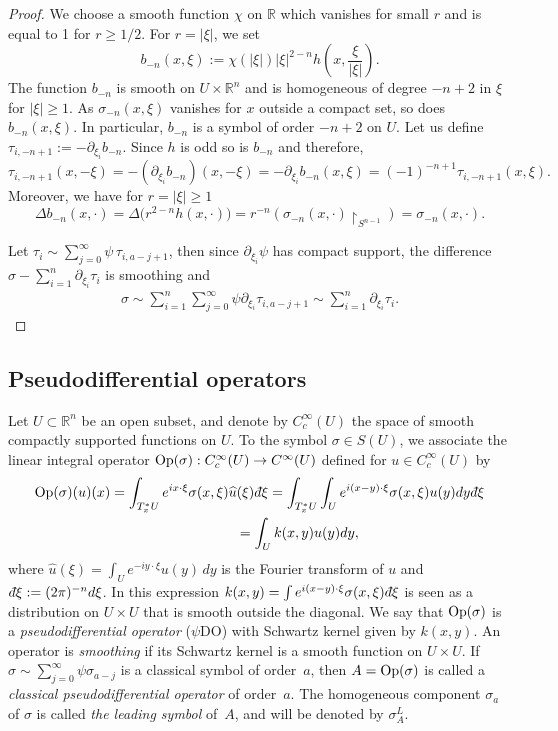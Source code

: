 \documentclass[11pt]{article}
\def\dbar{d{\hskip-1pt\bar{}}\hskip1pt}
\begin{document}
\begin{proof}
 We choose a smooth function $\chi$ on $\mathbb{R}$ which vanishes for small $r$ and is equal to 1 for $r\geq1/2$. For $r=|\xi|$, we set
\[
b_{-n}(x,\xi):=\chi(|\xi|)|\xi|^{2-n}h\left(x,\frac{\xi}{|\xi|}\right).
\]
The function $b_{-n}$ is smooth on $U\times\mathbb{R}^n$ and is homogeneous of degree $-n+2$ in $\xi$ for $|\xi|\geq1$. As $\sigma_{-n}(x,\xi)$ vanishes for $x$ outside a compact set, so does $b_{-n}(x,\xi)$. In particular, $b_{-n}$ is a symbol of order $-n+2$ on $U$. Let us def\/ine $\tau_{i,-n+1}:=-\partial_{\xi_i}b_{-n}$. Since $h$ is odd so is $b_{-n}$ and therefore,
\[
\tau_{i,-n+1}(x,-\xi)=-(\partial_{\xi_i}b_{-n})(x,-\xi)
=-\partial_{\xi_i}b_{-n}(x,\xi)
=(-1)^{-n+1}\tau_{i,-n+1}(x,\xi).
\]
Moreover, we have for $r=|\xi|\geq1$
\[
\Delta b_{-n}(x,\cdot)=\Delta\big(r^{2-n}h(x,\cdot)\big)=r^{-n}\left(\sigma_{-n}(x,\cdot)\upharpoonright_{S^{n-1}}\right)=\sigma_{-n}(x,\cdot).
\]


Let $\tau_i\sim\sum\limits_{j=0}^\infty\psi\,\tau_{i,a-j+1}$, then since $\partial_{\xi_i}\psi$ has compact support, the dif\/ference $\sigma-\sum\limits_{i=1}^n\partial_{\xi_i}\tau_i$ is smoothing and
\begin{gather*}
\sigma\sim\sum_{i=1}^n\sum_{j=0}^\infty\psi \partial_{\xi_i}\tau_{i,a-j+1}\sim\sum_{i=1}^n\partial_{\xi_i}\tau_i. \tag*{\qed}
\end{gather*}
\renewcommand{\qed}{}
\end{proof}

\subsection{Pseudodif\/ferential operators}

Let $U\subset \mathbb{R}^n$ be an open subset, and denote by $C^{\infty}_c (U)$ the space of smooth compactly supported functions on $U$. To the symbol $\sigma\in S(U)$, we associate the linear integral operator $\operatorname{Op}(\sigma):C^{\infty}_c (U)\to C^{\infty}(U)$ def\/ined for $u\in C^{\infty}_c (U)$ by
\begin{gather*}
\Op(\sigma)(u)(x) =\int_{T_x^*U}{e^{ix\cdot\xi}\sigma(x, \xi)\widehat u(\xi)\dbar\xi}
 =\int_{T_x^*U}{\int_{U}{e^{i(x-y)\cdot\xi}\sigma(x,\xi) u(y) dy\dbar\xi}}\\
\hphantom{\Op(\sigma)(u)(x)}{} =\int_{U}k(x,y)u(y)dy,
\end{gather*}
where $\widehat u(\xi)=\int_{U}{e^{-iy\cdot\xi}u(y)\,dy}$ is the Fourier transform of $u$ and $\dbar\xi:=(2\pi)^{-n}d\xi$.
In this expression $k(x,y)=\int{e^{i(x-y)\cdot\xi}\sigma(x, \xi)\dbar\xi}$ is seen as a distribution on $U\times U$ that is smooth outside the diagonal. We say that $\operatorname{Op}(\sigma)$ is a {\it pseudodifferential operator} ($\psi$DO) with Schwartz kernel given by $k(x,y)$. An operator is \emph{smoothing} if its Schwartz kernel is a smooth function on $U\times U$. If $\sigma\sim \sum\limits_{j=0}^{\infty}\psi\sigma_{a-j}$ is a classical symbol of order~$a$, then $A=\operatorname{Op}(\sigma)$ is called a {\it classical pseudodifferential operator} of order~$a$. The homogeneous component $\sigma_a$ of $\sigma$ is called {\it the leading symbol} of~$A$, and will be denoted by $\sigma^L_A$.
\end{document}
